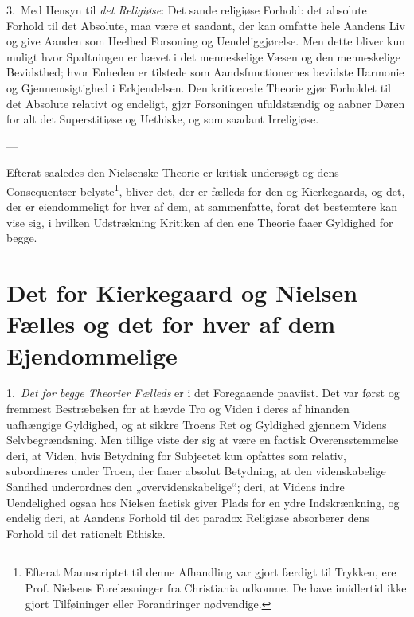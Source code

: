\documentclass[12pt,a4paper]{book}
\newcommand{\opage}[1]{\marginnote{\footnotesize\textit{[#1]}}}
\begin{document}
3.~Med Hensyn til \emph{det Religiøse}: Det sande religiøse Forhold: det absolute Forhold til
det Absolute, maa være et saadant, der kan omfatte hele Aandens Liv og give Aanden som Heelhed
Forsoning og Uendeliggjørelse. Men dette bliver kun muligt hvor Spaltningen er hævet i det
menneskelige Væsen og den menneskelige Bevidsthed; hvor Enheden er tilstede som
Aandsfunctionernes bevidste Harmonie og Gjennemsigtighed i Erkjendelsen. Den kriticerede
\opage{212}Theorie gjør Forholdet til det Absolute relativt og endeligt, gjør Forsoningen ufuldstændig og
aabner Døren for alt det Superstitiøse og Uethiske, og som saadant Irreligiøse.

\begin{center}---\end{center}

Efterat saaledes den Nielsenske Theorie er kritisk undersøgt og dens Consequentser
belyste\footnote{Efterat Manuscriptet til denne Afhandling var gjort færdigt til Trykken, ere
Prof. Nielsens Forelæsninger fra Christiania udkomne. De have imidlertid ikke gjort
Tilføininger eller Forandringer nødvendige.}, bliver det, der er fælleds for den og
Kierkegaards, og det, der er eiendommeligt for hver af dem, at sammenfatte, forat det
bestemtere kan vise sig, i hvilken Udstrækning Kritiken af den ene Theorie faaer Gyldighed for
begge.

\section{Det for Kierkegaard og Nielsen Fælles og det for hver af dem
  Ejendommelige}
\label{sec:faelles-ejendommelige}

1.~\emph{Det for begge Theorier Fælleds} er i det Foregaaende paaviist. Det var først og
fremmest Bestræbelsen for at hævde Tro og Viden i deres af hinanden uafhængige Gyldighed, og
at sikkre Troens Ret og Gyldighed gjennem Videns Selvbegrændsning. Men tillige viste der sig at
være en factisk Overensstemmelse deri, at Viden, hvis Betydning for Subjectet kun opfattes som
relativ, subordineres under Troen, der faaer absolut Betydning, at den videnskabelige Sandhed
underordnes den „overvidenskabelige“; deri, at Videns indre Uendelighed ogsaa hos Nielsen
factisk giver Plads for en ydre Indskrænkning, og endelig deri, at Aandens Forhold til det
paradox Religiøse absorberer dens Forhold til det rationelt Ethiske.
\end{document}

